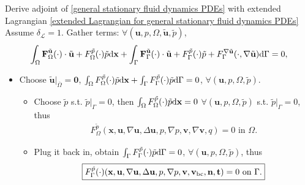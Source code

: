 \documentclass[10pt
hyperref={
    pdfauthor={Hong Quan Ba Nguyen},
    pdftitle={Optimal Shape Design of Air Ducts in Combustion Engines: Design a General Framework},
    pdfsubject={Talk},
    pdfcreator={LaTeX},
}
]{beamer}
\begin{document}
\begin{frame}{Derive adjoint of \eqref{general stationary fluid dynamics PDEs} with extended Lagrangian \eqref{extended Lagrangian for general stationary fluid dynamics PDEs}}
    Assume $\delta_{\mathcal{L}} = 1$. Gather terms: $\forall(\textbf{u},p,\Omega,\tilde{\textbf{u}},\tilde{p})$,
    \begin{align*}
        \int_\Omega \textbf{F}_\Omega^{\tilde{\textbf{u}}}(\cdot)\cdot\tilde{\textbf{u}} + F_\Omega^{\tilde{p}}(\cdot)\tilde{p}{\rm d}\textbf{x} + \int_\Gamma \textbf{F}_\Gamma^{\tilde{\textbf{u}}}(\cdot)\cdot\tilde{\textbf{u}} + F_\Gamma^{\tilde{p}}(\cdot)\tilde{p} + F_\Gamma^{\nabla\tilde{\textbf{u}}}(\cdot,\nabla\tilde{\textbf{u}}){\rm d}\Gamma = 0,
    \end{align*}
    \begin{itemize}
        \item Choose $\tilde{\textbf{u}}|_{\overline{\Omega}} = \textbf{0}$, $\int_\Omega F_\Omega^{\tilde{p}}(\cdot)\tilde{p}{\rm d}\textbf{x} + \int_\Gamma F_\Gamma^{\tilde{p}}(\cdot)\tilde{p}{\rm d}\Gamma = 0$, $\forall(\textbf{u},p,\Omega,\tilde{p})$.
        \begin{itemize}
            \item Choose $\tilde{p}$ s.t. $\tilde{p}|_\Gamma = 0$, then $\int_\Omega F_\Omega^{\tilde{p}}(\cdot)\tilde{p}{\rm d}\textbf{x} = 0$ $\forall(\textbf{u},p,\Omega,\tilde{p})$ s.t. $\tilde{p}|_\Gamma = 0$, thus
            \begin{align*}
                \boxed{F_\Omega^{\tilde{p}}(\textbf{x},\textbf{u},\nabla\textbf{u},\Delta\textbf{u},p,\nabla p,\textbf{v},\nabla\textbf{v},q) = 0 \mbox{ in } \Omega.}
            \end{align*}
            \item Plug it back in, obtain $\int_\Gamma F_\Gamma^{\tilde{p}}(\cdot)\tilde{p}{\rm d}\Gamma = 0$, $\forall(\textbf{u},p,\Omega,\tilde{p})$, thus
            \begin{align*}
                \boxed{F_\Gamma^{\tilde{p}}(\cdot)(\textbf{x},\textbf{u},\nabla\textbf{u},\Delta\textbf{u},p,\nabla p,\textbf{v},\textbf{v}_{\rm bc},\textbf{n},\textbf{t}) = 0 \mbox{ on } \Gamma.}
            \end{align*}
        \end{itemize}
    \end{itemize}
\end{frame}
\end{document}
